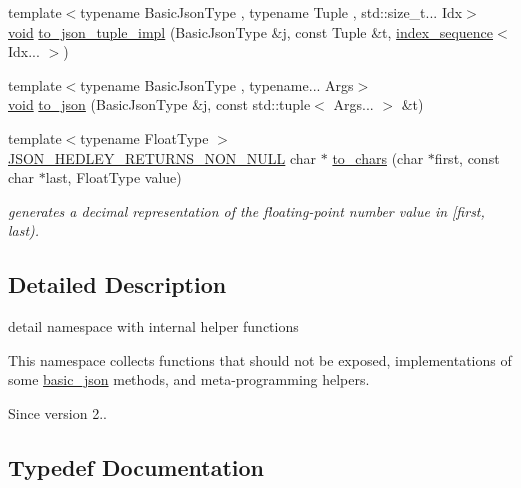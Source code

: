 \begin{DoxyCompactItemize}
\item 
{\footnotesize template$<$typename Basic\+Json\+Type , typename Tuple , std\+::size\+\_\+t... Idx$>$ }\\\mbox{\hyperlink{namespacenlohmann_1_1detail_a59fca69799f6b9e366710cb9043aa77d}{void}} \mbox{\hyperlink{namespacenlohmann_1_1detail_a510dfa15b01e9a8afe31600a27b28199}{to\+\_\+json\+\_\+tuple\+\_\+impl}} (Basic\+Json\+Type \&j, const Tuple \&t, \mbox{\hyperlink{structnlohmann_1_1detail_1_1index__sequence}{index\+\_\+sequence}}$<$ Idx... $>$)
\item 
{\footnotesize template$<$typename Basic\+Json\+Type , typename... Args$>$ }\\\mbox{\hyperlink{namespacenlohmann_1_1detail_a59fca69799f6b9e366710cb9043aa77d}{void}} \mbox{\hyperlink{namespacenlohmann_1_1detail_aa7a47b08eee864c2c108c04954919648}{to\+\_\+json}} (Basic\+Json\+Type \&j, const std\+::tuple$<$ Args... $>$ \&t)
\item 
{\footnotesize template$<$typename Float\+Type $>$ }\\\mbox{\hyperlink{json_8hpp_a5f2aaec3b681d0a72f7d6e90b70cdcd1}{J\+S\+O\+N\+\_\+\+H\+E\+D\+L\+E\+Y\+\_\+\+R\+E\+T\+U\+R\+N\+S\+\_\+\+N\+O\+N\+\_\+\+N\+U\+LL}} char $\ast$ \mbox{\hyperlink{namespacenlohmann_1_1detail_a6cca370ac6c99294dbe4fe24716a57dd}{to\+\_\+chars}} (char $\ast$first, const char $\ast$last, Float\+Type value)
\begin{DoxyCompactList}\small\item\em generates a decimal representation of the floating-\/point number value in \mbox{[}first, last). \end{DoxyCompactList}\end{DoxyCompactItemize}


\subsection{Detailed Description}
detail namespace with internal helper functions 

This namespace collects functions that should not be exposed, implementations of some \mbox{\hyperlink{classnlohmann_1_1basic__json}{basic\+\_\+json}} methods, and meta-\/programming helpers.

\begin{DoxySince}{Since}
version 2.. 
\end{DoxySince}


\subsection{Typedef Documentation}
\mbox{\label{namespacenlohmann_1_1detail_a45ec87326503b8884b664a9ef23a6c99}} 
